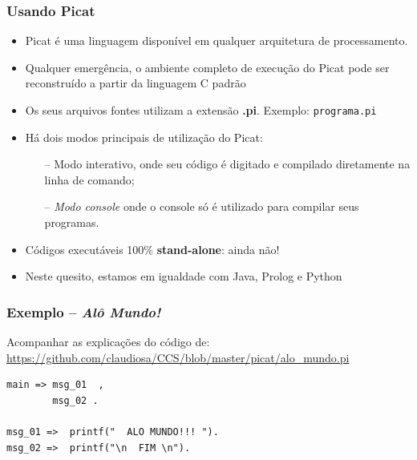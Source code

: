 \begin{frame}[fragile]
  \frametitle{Usando Picat}
  	\begin{itemize}
    
      \item Picat é uma linguagem  disponível em qualquer arquitetura de 
      processamento. 
      
      \pause
      \item Qualquer emergência, o ambiente completo de execução do Picat pode ser reconstruído a partir 
      da linguagem C padrão
      
      \pause
      \item Os seus arquivos fontes utilizam a extensão \textbf{.pi}. Exemplo: \texttt{programa.pi}
      \item Há dois modos principais de utilização do Picat: 
      
      \begin{itemize}
      	\item[--] Modo interativo, onde seu código é digitado e compilado diretamente na linha de 
        comando;
      	\item[--] \textit{Modo console} onde o console só é utilizado para compilar seus programas.
      \end{itemize}
      
      \pause
      \item Códigos executáveis 100\% \textbf{stand-alone}: ainda não!
      \item Neste quesito, estamos em igualdade com Java, Prolog e Python
     
    \end{itemize}
\end{frame}





\begin{frame}[fragile]
\frametitle{Exemplo -- \textit{Alô Mundo!}}

Acompanhar as explicações do código de:\\
\url{https://github.com/claudiosa/CCS/blob/master/picat/alo_mundo.pi}

\begin{verbatim}
main => msg_01  , 
        msg_02 .
        
msg_01 =>  printf("  ALO MUNDO!!! ").
msg_02 =>  printf("\n  FIM \n").
\end{verbatim}

\end{frame}


